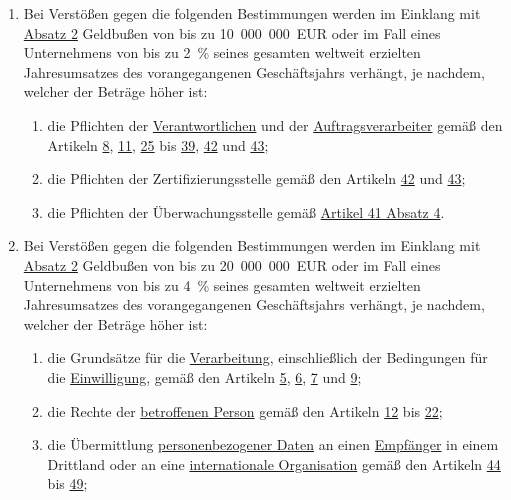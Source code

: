 \begin{enumerate}
  \item Bei Verstößen gegen die folgenden Bestimmungen werden im Einklang mit \hyperref[itm:83-2]{Absatz 2} Geldbußen
   von bis zu 10~000~000~EUR oder im Fall eines Unternehmens von bis zu 2~\% seines gesamten weltweit erzielten
   Jahresumsatzes des vorangegangenen Geschäftsjahrs verhängt, je nachdem, welcher der Beträge höher ist:
  \label{itm:83-4}

  \begin{enumerate}
  
    \item die Pflichten der \hyperref[itm:04-7]{Verantwortlichen} und der \hyperref[itm:04-8]{Auftragsverarbeiter} gemäß
     den Artikeln \hyperref[ch:8]{8},
     \hyperref[ch:11]{11}, \hyperref[ch:25]{25} bis \hyperref[ch:39]{39}, \hyperref[ch:42]{42} und \hyperref[ch:43]
      {43};
    \label{itm:83-4a}

    \item die Pflichten der Zertifizierungsstelle gemäß den Artikeln \hyperref[ch:42]{42} und \hyperref[ch:43]{43};
    \label{itm:83-4b}

    \item die Pflichten der Überwachungsstelle gemäß \hyperref[itm:41-4]{Artikel 41 Absatz 4}.
    \label{itm:83-4c}

  \end{enumerate}

  \item Bei Verstößen gegen die folgenden Bestimmungen werden im Einklang mit \hyperref[itm:83-2]{Absatz 2} Geldbußen
   von bis zu 20~000~000~EUR oder im Fall eines Unternehmens von bis zu 4~\% seines gesamten weltweit erzielten
   Jahresumsatzes des vorangegangenen Geschäftsjahrs verhängt, je nachdem, welcher der Beträge höher ist:
  \label{itm:83-5}

  \begin{enumerate}
  
    \item die Grundsätze für die \hyperref[itm:04-2]{Verarbeitung}, einschließlich der Bedingungen für die \hyperref
     [itm:04-11]{Einwilligung}, gemäß den Artikeln
     \hyperref[ch:5]{5}, \hyperref[ch:6]{6}, \hyperref[ch:7]{7} und \hyperref[ch:9]{9};
    \label{itm:83-5a}

    \item die Rechte der \hyperref[itm:04-1]{betroffenen Person} gemäß den Artikeln \hyperref[ch:12]{12} bis \hyperref
     [ch:22]{22};
    \label{itm:83-5b}

    \item die Übermittlung \hyperref[itm:04-1]{personenbezogener Daten} an einen \hyperref[itm:04-9]{Empfänger} in einem
     Drittland oder an eine \hyperref[itm:04-29]{internationale Organisation} gemäß den Artikeln \hyperref[ch:44]
     {44} bis \hyperref[ch:49]{49};
    \label{itm:83-5c}


\end{enumerate}
\end{enumerate}
